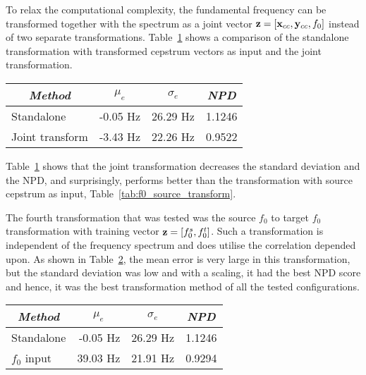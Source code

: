 To relax the computational complexity, the fundamental frequency can be transformed together with the spectrum as a joint vector $\mathbf{z} = \left[\mathbf{x}_{cc},\mathbf{y}_{cc},f_0\right]$ instead of two separate transformations. Table~\ref{tab:f0_joint_transform} shows a comparison of the standalone transformation with transformed cepstrum vectors as input and the joint transformation.
\begin{table}[htbp]
	\begin{center}
		\label{tab:f0_joint_transform}
		\begin{tabular}{lrrr}
			\toprule
			\multicolumn{1}{c}{\emph{Method}} & \multicolumn{1}{c}{\emph{$\mu_e$}} & \multicolumn{1}{c}{\emph{$\sigma_e$}} & \multicolumn{1}{c}{\emph{NPD}}\\
			\midrule
			Standalone & -0.05 Hz & 26.29 Hz & 1.1246 \\
			Joint transform & -3.43 Hz & 22.26 Hz & 0.9522 \\
			\bottomrule			
		\end{tabular}		
	\end{center}	
\end{table}
Table~\ref{tab:f0_joint_transform} shows that the joint transformation decreases the standard deviation and the NPD, and surprisingly, performs better than the transformation with source cepstrum as input, Table~\ref{tab:f0_source_transform}.

The fourth transformation that was tested was the source $f_0$ to target $f_0$ transformation with training vector $\mathbf{z} = \left[f_0^s,f_0^t\right]$. Such a transformation is independent of the frequency spectrum and does utilise the correlation \cite{najjary04} depended upon. As shown in Table~\ref{tab:f0_f0_transform}, the mean error is very large in this transformation, but the standard deviation was low and with a scaling, it had the best NPD score and hence, it was the best transformation method of all the tested configurations.
\begin{table}[htbp]
	\begin{center}
		\label{tab:f0_f0_transform}
		\begin{tabular}{lrrr}
			\toprule
			\multicolumn{1}{c}{\emph{Method}} & \multicolumn{1}{c}{\emph{$\mu_e$}} & \multicolumn{1}{c}{\emph{$\sigma_e$}} & \multicolumn{1}{c}{\emph{NPD}}\\
			\midrule
			Standalone & -0.05 Hz & 26.29 Hz & 1.1246 \\
			$f_0$ input & 39.03 Hz & 21.91 Hz & 0.9294 \\
			\bottomrule			
		\end{tabular}		
	\end{center}	
\end{table}

